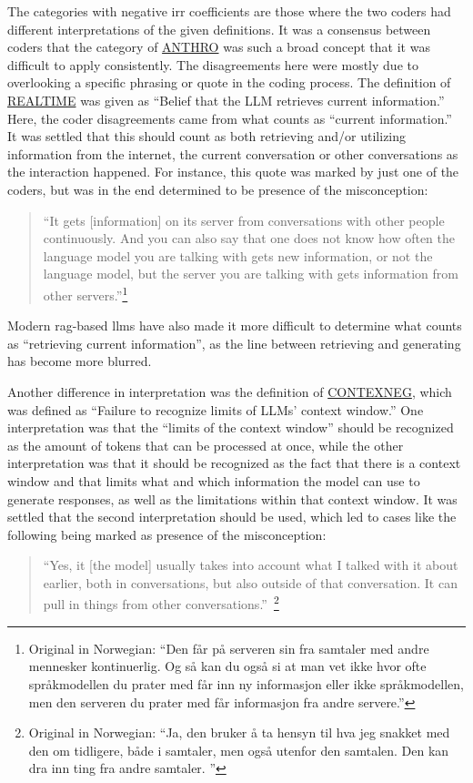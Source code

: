 The categories with negative \gls{irr} coefficients are those where the two coders had different interpretations of the given definitions. It was a consensus between coders that the category of \hyperref[anthro]{ANTHRO} was such a broad concept that it was difficult to apply consistently. The disagreements here were mostly due to overlooking a specific phrasing or quote in the coding process.
The definition of \hyperref[realtime]{REALTIME} was given as ``Belief that the LLM retrieves current information.'' Here, the coder disagreements came from what counts as ``current information.'' It was settled that this should count as both retrieving and/or utilizing information from the internet, the current conversation or other conversations as the interaction happened. For instance, this quote was marked by just one of the coders, but was in the end determined to be presence of the misconception:
\begin{quote}
``It gets [information] on its server from conversations with other people continuously. And you can also say that one does not know how often the language model you are talking with gets new information, or not the language model, but the server you are talking with gets information from other servers.''\footnote{Original in Norwegian: 
``Den får på serveren sin fra samtaler med andre mennesker kontinuerlig. Og så kan du også si at man vet ikke hvor ofte språkmodellen du prater med får inn ny informasjon eller ikke språkmodellen, men den serveren du prater med får informasjon fra andre servere.''}
\end{quote}
Modern \gls{rag}-based \gls{llms} have also made it more difficult to determine what counts as ``retrieving current information'', as the line between retrieving and generating has become more blurred.

Another difference in interpretation was the definition of \hyperref[contexneg]{CONTEXNEG}, which was defined as ``Failure to recognize limits of LLMs' context window.'' One interpretation was that the ``limits of the context window'' should be recognized as the amount of tokens that can be processed at once, while the other interpretation was that it should be recognized as the fact that there is a context window and that limits what and which information the model can use to generate responses, as well as the limitations within that context window. It was settled that the second interpretation should be used, which led to cases like the following being marked as presence of the misconception:
\begin{quote}
``Yes, it [the model] usually takes into account what I talked with it about earlier, both in conversations, but also outside of that conversation. It can pull in things from other conversations.''~\footnote{Original in Norwegian: ``Ja, den bruker å ta hensyn til hva jeg snakket med den om tidligere, både i samtaler, men også utenfor den samtalen. Den kan dra inn ting fra andre samtaler. ''}
\end{quote}

